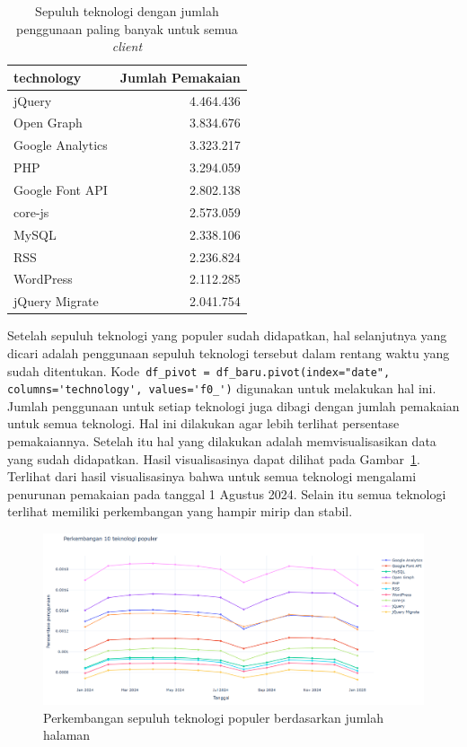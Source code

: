 \begin{table}[H]
    \centering
    \caption{Sepuluh teknologi dengan jumlah penggunaan paling banyak untuk semua \textit{client}}
    \label{tab:sepuluhsemua}
    \begin{tabular}{|l|r|}
        \hline
        technology & Jumlah Pemakaian \\ \hline
        jQuery & 4.464.436 \\ \hline
        Open Graph & 3.834.676 \\ \hline
        Google Analytics & 3.323.217 \\ \hline
        PHP & 3.294.059 \\ \hline
        Google Font API & 2.802.138 \\ \hline
        core-js & 2.573.059 \\ \hline
        MySQL & 2.338.106 \\ \hline
        RSS & 2.236.824 \\ \hline
        WordPress & 2.112.285 \\ \hline
        jQuery Migrate & 2.041.754 \\ \hline
    \end{tabular}
\end{table}
Setelah sepuluh teknologi yang populer sudah didapatkan, hal selanjutnya yang dicari adalah penggunaan sepuluh teknologi tersebut dalam rentang waktu yang sudah ditentukan. Kode~\verb|df_pivot = df_baru.pivot(index="date", columns='technology', values='f0_')| digunakan untuk melakukan hal ini. Jumlah penggunaan untuk setiap teknologi juga dibagi dengan jumlah pemakaian untuk semua teknologi. Hal ini dilakukan agar lebih terlihat persentase pemakaiannya. Setelah itu hal yang dilakukan adalah memvisualisasikan data yang sudah didapatkan. Hasil visualisasinya dapat dilihat pada Gambar~\ref{fig:sample10}. Terlihat dari hasil visualisasinya bahwa untuk semua teknologi mengalami penurunan pemakaian pada tanggal 1 Agustus 2024. Selain itu semua teknologi terlihat memiliki perkembangan yang hampir mirip dan stabil.
\begin{figure}[H]
    \centering
    \includegraphics[width=0.7\linewidth]{Gambar/Perkembangan 10 teknologi populer.png}
    \caption{Perkembangan sepuluh teknologi populer berdasarkan jumlah halaman \web}
    \label{fig:sample10}
\end{figure}

